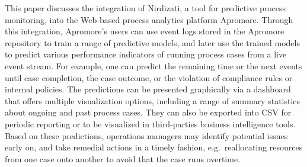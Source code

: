 This paper discusses the integration of Nirdizati, a tool for predictive process monitoring, into the Web-based process analytics platform Apromore. Through this integration, Apromore's users can use event logs stored in the Apromore repository to train a range of predictive models, and later use the trained models to predict various performance indicators of running process cases from a live event stream. For example, one can predict the remaining time or the next events until case completion, the case outcome, or the violation of compliance rules or internal policies. %
The predictions can be presented graphically via a dashboard that offers multiple visualization options, including a range of summary statistics about ongoing and past process cases. They can also be exported into CSV for periodic reporting or to be visualized in third-parties business intelligence tools. Based on these predictions, operations managers may identify potential issues early on, and take remedial actions in a timely fashion, e.g.\ reallocating resources from one case onto another to avoid that the case runs overtime. %
